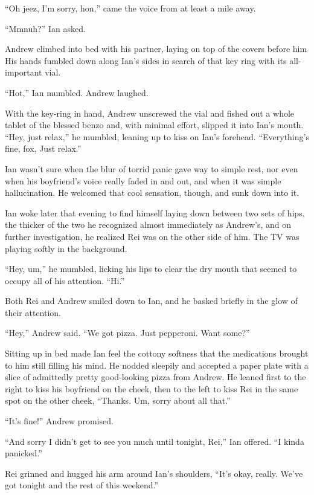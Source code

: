 \secdiv

``Oh jeez, I'm sorry, hon,'' came the voice from at least a mile away.

``Mmnuh?'' Ian asked.

Andrew climbed into bed with his partner, laying on top of the covers before him His hands fumbled down along Ian's sides in search of that key ring with its all-important vial.

``Hot,'' Ian mumbled. Andrew laughed.

With the key-ring in hand, Andrew unscrewed the vial and fished out a whole tablet of the blessed benzo and, with minimal effort, slipped it into Ian's mouth. ``Hey, just relax,'' he mumbled, leaning up to kiss on Ian's forehead. ``Everything's fine, fox, Just relax.''

Ian wasn't sure when the blur of torrid panic gave way to simple rest, nor even when his boyfriend's voice really faded in and out, and when it was simple hallucination. He welcomed that cool sensation, though, and sunk down into it.

\secdiv

Ian woke later that evening to find himself laying down between two sets of hips, the thicker of the two he recognized almost immediately as Andrew's, and on further investigation, he realized Rei was on the other side of him. The TV was playing softly in the background.

``Hey, um,'' he mumbled, licking his lips to clear the dry mouth that seemed to occupy all of his attention. ``Hi.''

Both Rei and Andrew smiled down to Ian, and he basked briefly in the glow of their attention.

``Hey,'' Andrew said. ``We got pizza. Just pepperoni. Want some?''

Sitting up in bed made Ian feel the cottony softness that the medications brought to him still filling his mind. He nodded sleepily and accepted a paper plate with a slice of admittedly pretty good-looking pizza from Andrew. He leaned first to the right to kiss his boyfriend on the cheek, then to the left to kiss Rei in the same spot on the other cheek, ``Thanks. Um, sorry about all that.''

``It's fine!'' Andrew promised.

``And sorry I didn't get to see you much until tonight, Rei,'' Ian offered. ``I kinda panicked.''

Rei grinned and hugged his arm around Ian's shoulders, ``It's okay, really. We've got tonight and the rest of this weekend.''

